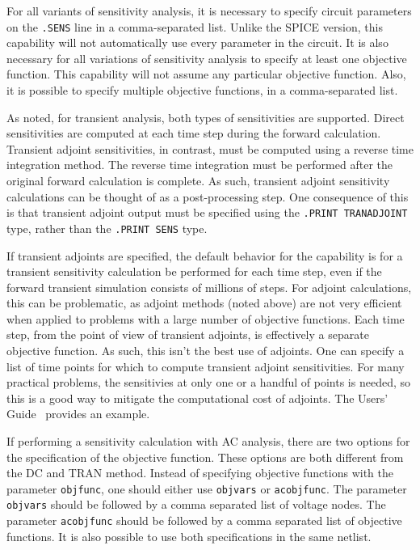 \begin{Command}
For all variants of sensitivity analysis, it is necessary to specify 
circuit parameters on the \texttt{.SENS} line in a comma-separated list.  Unlike the SPICE version, 
this capability will not automatically use every parameter in the circuit.
It is also necessary for all variations of sensitivity analysis to specify at least 
one objective function.  This capability will not assume any particular 
objective function.  Also, it is possible to specify multiple
objective functions, in a comma-separated list.

As noted, for transient analysis, both types of sensitivities are supported.
Direct sensitivities are computed at each time step during the forward 
calculation.  Transient adjoint sensitivities, in contrast, must be computed
using a reverse time integration method.  The reverse time integration must be 
performed after the original forward calculation is complete.  As such, transient 
adjoint sensitivity calculations can be thought of as a post-processing step.  
One consequence of this is that transient adjoint output must be specified using 
the \texttt{.PRINT TRANADJOINT} type, rather than the \texttt{.PRINT SENS} 
type.

If transient adjoints are specified, the default behavior for the capability is 
for a transient sensitivity calculation be performed for each time step, even 
if the forward transient simulation consists of millions of steps.  For adjoint 
calculations, this can be problematic, as adjoint methods (noted above) are not 
very efficient when applied to problems with a large number of objective functions.
Each time step, from the point of view of transient adjoints, is effectively a 
separate objective function.  As such, this isn't the best use of adjoints.  
One can specify  a list of time points for which to compute transient adjoint
sensitivities. For many practical problems, the sensitivies at only one or a 
handful of points is needed, so this is a good way to mitigate the computational 
cost of adjoints.  The \Xyce{} Users' Guide~\UsersGuide{} provides an example.

If performing a sensitivity calculation with AC analysis, 
there are two options for the specification of the 
objective function. These options are both different from the DC and TRAN method.
Instead of specifying objective functions with the parameter \texttt{objfunc},
one should either use \texttt{objvars} or \texttt{acobjfunc}.  
The parameter \texttt{objvars} should be followed by a comma separated list of voltage nodes.
The parameter \texttt{acobjfunc} should be followed by a comma separated list of objective functions.
It is also possible to use both specifications in the same netlist.

\end{Command}
